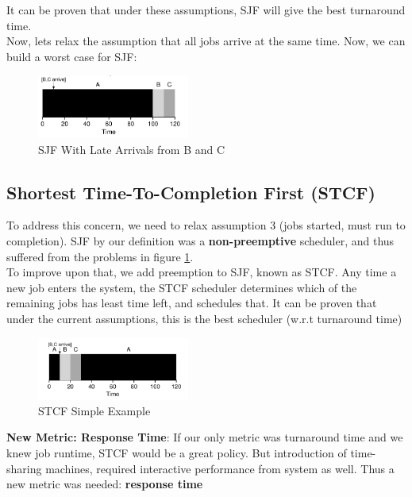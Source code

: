 It can be proven that under these assumptions, SJF will give the best
turnaround time.\\

Now, lets relax the assumption that all jobs arrive  at the same time. Now,
we can build a worst case for SJF:

\begin{figure}[h!]
    \begin{center}
        \includegraphics[width=5cm]{img/74}
        \caption{SJF With Late Arrivals from B and C}
        \label{74}
    \end{center}
\end{figure}

\subsection{Shortest Time-To-Completion First (STCF)}

To address this concern, we need to relax assumption 3 (jobs started, must run
to completion). SJF by our definition was a \textbf{non-preemptive} scheduler,
and thus suffered from the problems in figure \ref{74}.\\

To improve upon that, we add preemption to SJF, known as STCF. Any time
a new job enters the system, the STCF scheduler determines which of the
remaining jobs has least time left, and schedules that. It can be proven
that under the current assumptions, this is the best scheduler
(w.r.t turnaround time)

\begin{figure}[h!]
    \begin{center}
        \includegraphics[width=5cm]{img/75}
        \caption{STCF Simple Example}
    \end{center}
\end{figure}

\textbf{New Metric: Response Time}: If our only metric was turnaround time and
we knew job runtime, STCF would be a great policy. But introduction of
time-sharing machines, required interactive performance from system as well.
Thus a new metric was needed: \textbf{response time}

